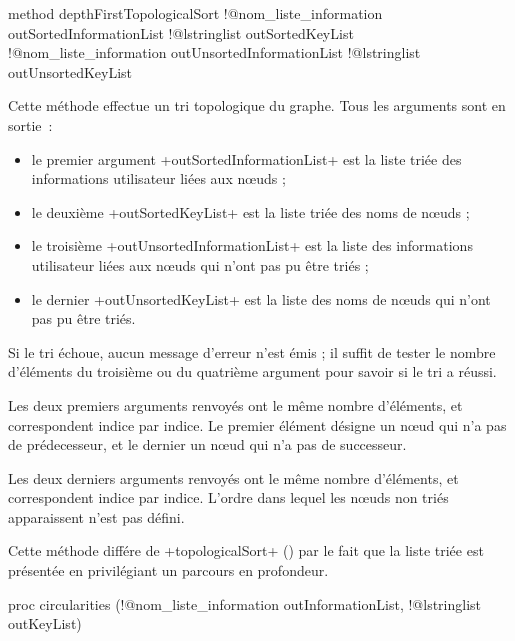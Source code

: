 \begin{galgas3}
method depthFirstTopologicalSort !@nom_liste_information outSortedInformationList
                               !@lstringlist outSortedKeyList
                               !@nom_liste_information outUnsortedInformationList
                               !@lstringlist outUnsortedKeyList
\end{galgas3}

Cette méthode effectue un tri topologique du graphe. Tous les arguments sont en sortie~:
\begin{itemize}
  \item le premier argument \ggst+outSortedInformationList+ est la liste triée des informations utilisateur liées aux nœuds ;
  \item le deuxième \ggst+outSortedKeyList+ est la liste triée des noms de nœuds ;
  \item le troisième \ggst+outUnsortedInformationList+ est la liste des informations utilisateur liées aux nœuds qui n'ont pas pu être triés ;
  \item le dernier \ggst+outUnsortedKeyList+ est la liste des noms de nœuds qui n'ont pas pu être triés.
\end{itemize}

Si le tri échoue, aucun message d'erreur n'est émis ; il suffit de tester le nombre d'éléments du troisième ou du quatrième argument pour savoir si le tri a réussi.

Les deux premiers arguments renvoyés ont le même nombre d'éléments, et correspondent indice par indice. Le premier élément désigne un nœud qui n'a pas de prédecesseur, et le dernier un nœud qui n'a pas de successeur.


Les deux derniers arguments renvoyés ont le même nombre d'éléments, et correspondent indice par indice. L'ordre dans lequel les nœuds non triés apparaissent n'est pas défini.

Cette méthode différe de \ggst+topologicalSort+ () par le fait que la liste triée est présentée en privilégiant un parcours en profondeur.







\begin{galgas4}
proc circularities (!@nom_liste_information outInformationList,
                  !@lstringlist outKeyList)
\end{galgas4}

